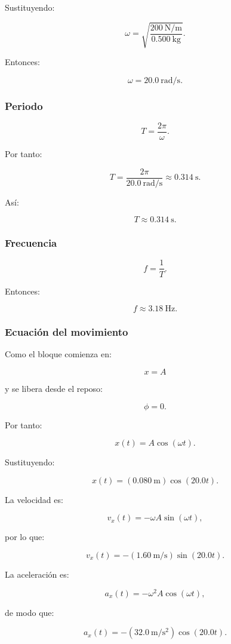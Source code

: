 Sustituyendo:

\[
\omega
=
\sqrt{
\frac{\SI{200}{\newton\per\meter}}
{\SI{0.500}{\kilogram}}
}.
\]

Entonces:

\[ \boxed{\omega=\SI{20.0}{\radian\per\second}}. \]

\subsubsection*{Periodo}

\[ T=\frac{2\pi}{\omega}. \]

Por tanto:

\[
T
=
\frac{2\pi}
{\SI{20.0}{\radian\per\second}}
\approx
\SI{0.314}{\second}.
\]

Así:

\[ \boxed{T\approx\SI{0.314}{\second}}. \]

\subsubsection*{Frecuencia}

\[ f=\frac{1}{T}. \]

Entonces:

\[ \boxed{f\approx\SI{3.18}{\hertz}}. \]

\subsubsection*{Ecuación del movimiento}

Como el bloque comienza en:

\[ x=A \]

y se libera desde el reposo:

\[ \phi=0. \]

Por tanto:

\[ x(t)=A\cos(\omega t). \]

Sustituyendo:

\[ \boxed{x(t)=(\SI{0.080}{\meter})\cos(20.0t)}. \]

La velocidad es:

\[ v_x(t)=-\omega A\sin(\omega t), \]

por lo que:

\[ \boxed{v_x(t)=-(\SI{1.60}{\meter\per\second})\sin(20.0t)}. \]

La aceleración es:

\[ a_x(t)=-\omega^2A\cos(\omega t), \]

de modo que:

\[ \boxed{a_x(t)=-(\SI{32.0}{\meter\per\second\squared})\cos(20.0t)}. \]

